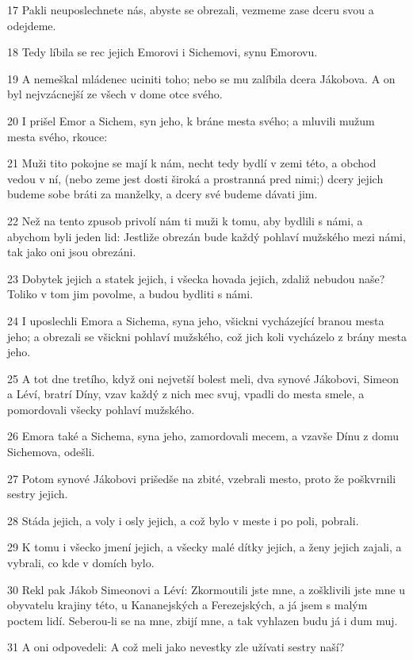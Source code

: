 \par 17 Pakli neuposlechnete nás, abyste se obrezali, vezmeme zase dceru svou a odejdeme.
\par 18 Tedy líbila se rec jejich Emorovi i Sichemovi, synu Emorovu.
\par 19 A nemeškal mládenec uciniti toho; nebo se mu zalíbila dcera Jákobova. A on byl nejvzácnejší ze všech v dome otce svého.
\par 20 I prišel Emor a Sichem, syn jeho, k bráne mesta svého; a mluvili mužum mesta svého, rkouce:
\par 21 Muži tito pokojne se mají k nám, necht tedy bydlí v zemi této, a obchod vedou v ní, (nebo zeme jest dosti široká a prostranná pred nimi;) dcery jejich budeme sobe bráti za manželky, a dcery své budeme dávati jim.
\par 22 Než na tento zpusob privolí nám ti muži k tomu, aby bydlili s námi, a abychom byli jeden lid: Jestliže obrezán bude každý pohlaví mužského mezi námi, tak jako oni jsou obrezáni.
\par 23 Dobytek jejich a statek jejich, i všecka hovada jejich, zdaliž nebudou naše? Toliko v tom jim povolme, a budou bydliti s námi.
\par 24 I uposlechli Emora a Sichema, syna jeho, všickni vycházející branou mesta jeho; a obrezali se všickni pohlaví mužského, což jich koli vycházelo z brány mesta jeho.
\par 25 A tot dne tretího, když oni nejvetší bolest meli, dva synové Jákobovi, Simeon a Léví, bratrí Díny, vzav každý z nich mec svuj, vpadli do mesta smele, a pomordovali všecky pohlaví mužského.
\par 26 Emora také a Sichema, syna jeho, zamordovali mecem, a vzavše Dínu z domu Sichemova, odešli.
\par 27 Potom synové Jákobovi prišedše na zbité, vzebrali mesto, proto že poškvrnili sestry jejich.
\par 28 Stáda jejich, a voly i osly jejich, a což bylo v meste i po poli, pobrali.
\par 29 K tomu i všecko jmení jejich, a všecky malé dítky jejich, a ženy jejich zajali, a vybrali, co kde v domích bylo.
\par 30 Rekl pak Jákob Simeonovi a Léví: Zkormoutili jste mne, a zošklivili jste mne u obyvatelu krajiny této, u Kananejských a Ferezejských, a já jsem s malým poctem lidí. Seberou-li se na mne, zbijí mne, a tak vyhlazen budu já i dum muj.
\par 31 A oni odpovedeli: A což meli jako nevestky zle užívati sestry naší?

